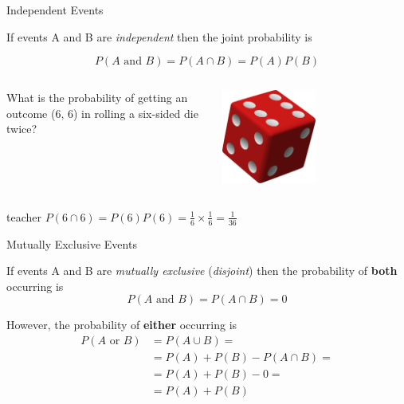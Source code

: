 \begin{frame}{Independent Events}

    If events A and B are \emph{independent} then the joint probability is
    
    \begin{equation}
        P(A\text{ and }B) = P(A \cap B) = P(A)P(B)
    \end{equation}
    
    
    \begin{example}
        \medskip
        \begin{columns}
            \begin{column}{0.65\textwidth}
                What is the probability of getting an outcome (6, 6) in rolling a six-sided die twice?
            \end{column}
            \begin{column}{0.25\textwidth}
                \includegraphics[width=0.5\textwidth]{gfx/web/die}
            \end{column}
        \end{columns}
    \end{example}
    \medskip
    \begin{shownto}{teacher}
        \pause
        $P(6 \cap 6) = P(6)P(6) = \frac{1}{6} \times \frac{1}{6} = \frac{1}{36}$
    \end{shownto}

\end{frame}

\begin{frame}{Mutually Exclusive Events}

    If events A and B are \emph{mutually exclusive} (\emph{disjoint}) then the probability of \textbf{both} occurring is
    \begin{equation}
    P(A\text{ and }B) = P(A \cap B) = 0
    \end{equation}
    
    However, the probability of \textbf{either} occurring is
    \begin{equation}
    \begin{split}
    P(A\text{ or }B) & = P(A \cup B) = \\
    & = P(A) + P(B) - P(A \cap B) = \\
    & = P(A) + P(B) - 0 = \\
    & = P(A) + P(B)
    \end{split}
    \end{equation}
    
\end{frame}

